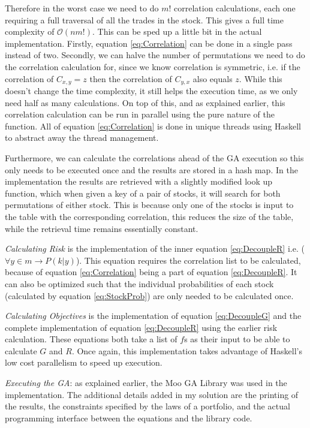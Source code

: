 \documentclass[11pt]{article}
\newcommand{\bigO}{\mathcal{O}}
\begin{document}
    Therefore in the worst case we need to do \(m!\) correlation calculations, each one requiring a
    full traversal of all the trades in the stock. This gives a full time complexity of 
    \(\bigO (nm!) \). This can be sped up a little bit in the actual implementation. Firstly,
    equation \ref{eq:Correlation} can be done in a single pass instead of two. Secondly, we can
    halve the number of permutations we need to do the correlation calculation for, since we know
    correlation is symmetric, i.e. if the correlation of \(C_{x,y} = z\) then the correlation
    of \(C_{y,x}\) also equals \(z\). While this doesn't change the time complexity, it still helps
    the execution time, as we only need half as many calculations. On top of this, and as explained
    earlier, this correlation calculation can be run in parallel using the pure nature of the function.
    All of equation \ref{eq:Correlation} is done in unique threads using Haskell to abstract away
    the thread management.

    Furthermore, we can calculate the correlations ahead of the GA execution so this only needs to be
    executed once and the results are stored in a hash map. In the implementation the results are
    retrieved
    with a slightly modified look up function, which when given a key of a pair of stocks, it will
    search for both permutations of either stock. This is because only one of the stocks is input to the
    table with the corresponding correlation, this reduces the size of the table, while the retrieval time
    remains essentially constant.

    \textit{Calculating Risk} is the implementation of the inner equation \ref{eq:DecoupleR} 
    i.e. (\(\forall y \in m \to P(k|y)\)). This equation
    requires the correlation list to be calculated, because of equation \ref{eq:Correlation} being a
    part of equation \ref{eq:DecoupleR}. It can also be optimized such that the individual
    probabilities of each stock (calculated by equation \ref{eq:StockProb}) are only needed to be
    calculated once.

    \textit{Calculating Objectives} is the implementation of equation \ref{eq:DecoupleG} and the complete
    implementation of equation \ref{eq:DecoupleR} using the earlier risk calculation. These
    equations both take a list of \(f\)s as their input to be able to calculate \(G\) and \(R\).
    Once again, this implementation takes advantage of Haskell's low cost parallelism to speed
    up execution.

    \textit{Executing the GA}: as explained earlier, the Moo GA Library \cite{Moo} was used in
    the implementation. The additional details added in my solution are the printing of the results,
    the constraints specified by the laws of a portfolio, and the actual programming interface
    between the equations and the library code.
\end{document}
